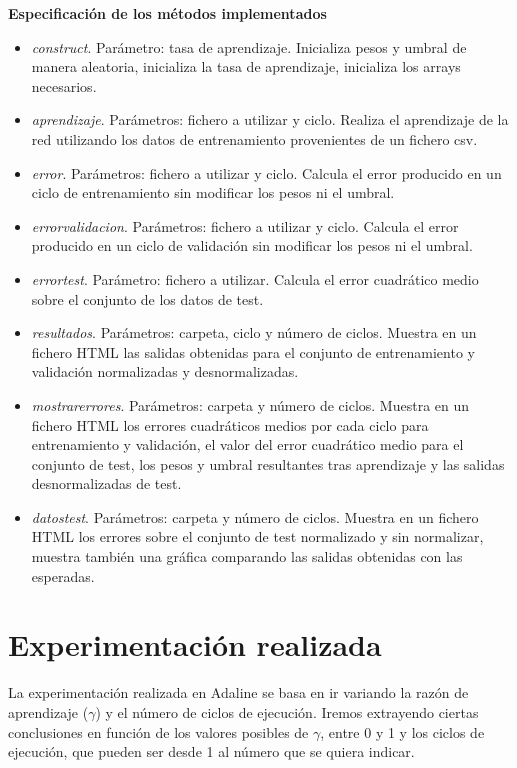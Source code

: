 \documentclass[11pt,spanish,listoffigures,listoftables]{workluis}
\begin{document}
\par \textbf{Especificación de los métodos implementados}

\begin{itemize}
\item \textit{construct}. Parámetro: tasa de aprendizaje. Inicializa pesos y umbral de manera aleatoria, inicializa la tasa de aprendizaje, inicializa los arrays necesarios.
\item \textit{aprendizaje}. Parámetros: fichero a utilizar y ciclo. Realiza el aprendizaje de la red utilizando los datos de entrenamiento provenientes de un fichero csv.
\item \textit{error}. Parámetros: fichero a utilizar y ciclo. Calcula el error producido en un ciclo de entrenamiento sin modificar los pesos ni el umbral.
\item \textit{errorvalidacion}. Parámetros: fichero a utilizar y ciclo. Calcula el error producido en un ciclo de validación sin modificar los pesos ni el umbral.
\item \textit{errortest}. Parámetro: fichero a utilizar. Calcula el error cuadrático medio sobre el conjunto de los datos de test.
\item \textit{resultados}. Parámetros: carpeta, ciclo y número de ciclos. Muestra en un fichero HTML las salidas obtenidas para el conjunto de entrenamiento y validación normalizadas y desnormalizadas.
\item \textit{mostrarerrores}. Parámetros: carpeta y número de ciclos. Muestra en un fichero HTML los errores cuadráticos medios por cada ciclo para entrenamiento y validación, el valor del error cuadrático medio para el conjunto de test, los pesos y umbral resultantes tras aprendizaje y las salidas desnormalizadas de test.
\item \textit{datostest}. Parámetros: carpeta y número de ciclos. Muestra en un fichero HTML los errores sobre el conjunto de test normalizado y sin normalizar, muestra también una gráfica comparando las salidas obtenidas con las esperadas.
\end{itemize}

\section{Experimentación realizada}

\par La experimentación realizada en Adaline se basa en ir variando la razón de aprendizaje ($\gamma$) y el número de ciclos de ejecución. Iremos extrayendo ciertas conclusiones en función de los valores posibles de $\gamma$, entre 0 y 1 y los ciclos de ejecución, que pueden ser desde 1 al número que se quiera indicar.
\end{document}
